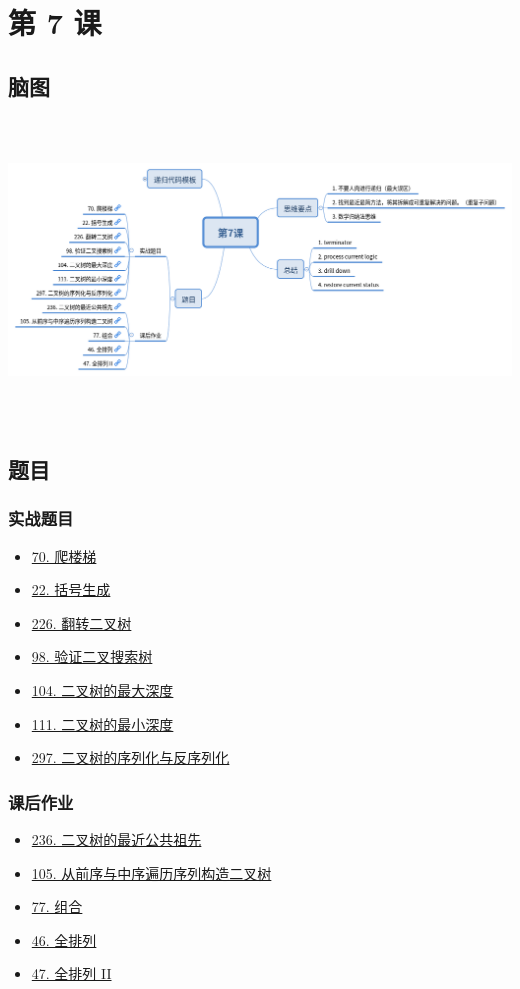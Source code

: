 \newpage
\section{第 7 课}

\subsection{脑图}

\includegraphics[width=170mm,height=80mm]{images/第7课.png}

\subsection{题目}

\subsubsection{实战题目}

\begin{itemize}
  \item \hyperref[leetcode:70]{70. 爬楼梯}
  \item \hyperref[leetcode:22]{22. 括号生成}
  \item \hyperref[leetcode:226]{226. 翻转二叉树}
  \item \hyperref[leetcode:98]{98. 验证二叉搜索树}
  \item \hyperref[leetcode:104]{104. 二叉树的最大深度}
  \item \hyperref[leetcode:111]{111. 二叉树的最小深度}
  \item \hyperref[leetcode:297]{297. 二叉树的序列化与反序列化}
\end{itemize}

\subsubsection{课后作业}

\begin{itemize}
  \item \hyperref[leetcode:236]{236. 二叉树的最近公共祖先}
  \item \hyperref[leetcode:105]{105. 从前序与中序遍历序列构造二叉树}
  \item \hyperref[leetcode:77]{77. 组合}
  \item \hyperref[leetcode:46]{46. 全排列}
  \item \hyperref[leetcode:47]{47. 全排列 II}
\end{itemize}
